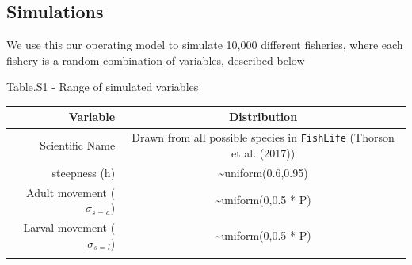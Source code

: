 \documentclass[]{article}
\begin{document}
\hypertarget{simulations}{%
\subsection{Simulations}\label{simulations}}

We use this our operating model to simulate 10,000 different fisheries, where each fishery is a random combination of variables, described below

Table.S1 - Range of simulated variables

\begin{longtable}[]{@{}rc@{}}
\toprule
\begin{minipage}[b]{0.41\columnwidth}\raggedleft
Variable\strut
\end{minipage} & \begin{minipage}[b]{0.53\columnwidth}\centering
Distribution\strut
\end{minipage}\tabularnewline
\midrule
\endhead
\begin{minipage}[t]{0.41\columnwidth}\raggedleft
Scientific Name\strut
\end{minipage} & \begin{minipage}[t]{0.53\columnwidth}\centering
Drawn from all possible species in \texttt{FishLife} (Thorson et al. (2017))\strut
\end{minipage}\tabularnewline
\begin{minipage}[t]{0.41\columnwidth}\raggedleft
steepness (h)\strut
\end{minipage} & \begin{minipage}[t]{0.53\columnwidth}\centering
\textasciitilde{}uniform(0.6,0.95)\strut
\end{minipage}\tabularnewline
\begin{minipage}[t]{0.41\columnwidth}\raggedleft
Adult movement (\(\sigma_{s=a}\))\strut
\end{minipage} & \begin{minipage}[t]{0.53\columnwidth}\centering
\textasciitilde{}uniform(0,0.5 * P)\strut
\end{minipage}\tabularnewline
\begin{minipage}[t]{0.41\columnwidth}\raggedleft
Larval movement (\(\sigma_{s=l}\))\strut
\end{minipage} & \begin{minipage}[t]{0.53\columnwidth}\centering
\textasciitilde{}uniform(0,0.5 * P)\strut
\end{minipage}\tabularnewline
\begin{minipage}[t]{0.41\columnwidth}\raggedleft

\end{minipage}
\end{longtable}
\end{document}
